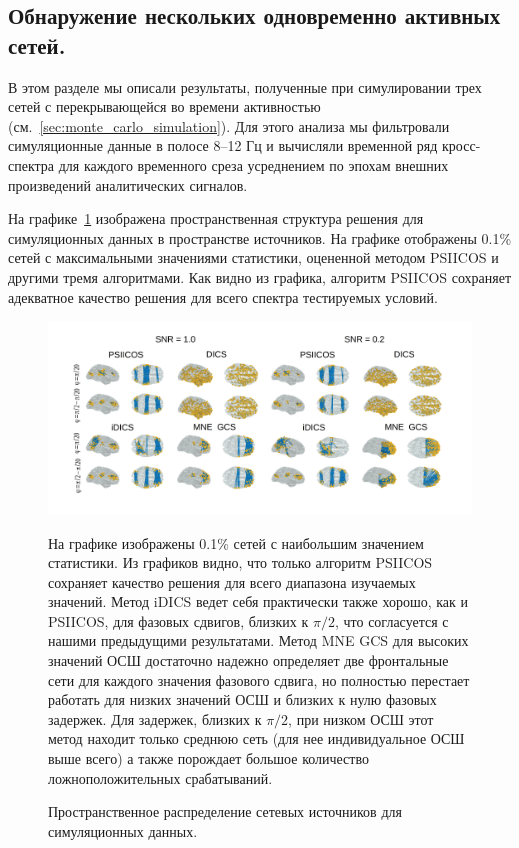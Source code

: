 \subsection{Обнаружение нескольких одновременно активных сетей.}

В этом разделе мы описали результаты, полученные при симулировании трех сетей с
перекрывающейся во времени активностью (см.~\ref{sec:monte_carlo_simulation}).
Для этого анализа мы фильтровали симуляционные данные в полосе 8--12 Гц и
вычисляли временной ряд кросс-спектра для каждого временного среза усреднением
по эпохам внешних произведений аналитических сигналов.

На графике~\ref{fig:05} изображена пространственная структура решения для
симуляционных данных в пространстве источников. На графике отображены 0.1\% сетей
с максимальными значениями статистики, оцененной методом PSIICOS и другими тремя
алгоритмами. Как видно из графика, алгоритм PSIICOS сохраняет адекватное качество решения
для всего спектра тестируемых условий.

\begin{figure}[!ht]
 \includegraphics[width=1\textwidth]{../images/psiicos_paper/Figure5_hr.jpg}
 \caption{Пространственное распределение сетевых источников для симуляционных данных.}\label{fig:05} %
     На графике изображены 0.1\% сетей с наибольшим значением
     статистики. Из графиков видно, что только алгоритм PSIICOS сохраняет
     качество решения для всего диапазона изучаемых значений.
     Метод iDICS ведет себя практически также хорошо, как и PSIICOS,
     для фазовых сдвигов, близких к $\pi/2$, что согласуется с нашими предыдущими
     результатами. Метод MNE GCS для высоких значений ОСШ достаточно надежно определяет
     две фронтальные сети для каждого значения фазового сдвига, но полностью перестает
     работать для низких значений ОСШ и близких к нулю фазовых задержек. Для задержек,
     близких к $\pi/2$, при низком ОСШ этот метод находит только среднюю сеть
     (для нее индивидуальное ОСШ выше всего) а также порождает большое количество
     ложноположительных срабатываний.
\end{figure}%

